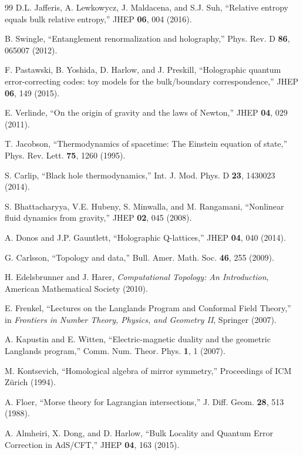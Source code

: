 \documentclass[12pt,a4paper]{article}
\begin{document}
\begin{thebibliography}{99}
D.L. Jafferis, A. Lewkowycz, J. Maldacena, and S.J. Suh, ``Relative entropy equals bulk relative entropy,'' JHEP \textbf{06}, 004 (2016).

B. Swingle, ``Entanglement renormalization and holography,'' Phys. Rev. D \textbf{86}, 065007 (2012).

F. Pastawski, B. Yoshida, D. Harlow, and J. Preskill, ``Holographic quantum error-correcting codes: toy models for the bulk/boundary correspondence,'' JHEP \textbf{06}, 149 (2015).

E. Verlinde, ``On the origin of gravity and the laws of Newton,'' JHEP \textbf{04}, 029 (2011).

T. Jacobson, ``Thermodynamics of spacetime: The Einstein equation of state,'' Phys. Rev. Lett. \textbf{75}, 1260 (1995).

S. Carlip, ``Black hole thermodynamics,'' Int. J. Mod. Phys. D \textbf{23}, 1430023 (2014).

S. Bhattacharyya, V.E. Hubeny, S. Minwalla, and M. Rangamani, ``Nonlinear fluid dynamics from gravity,'' JHEP \textbf{02}, 045 (2008).

A. Donos and J.P. Gauntlett, ``Holographic Q-lattices,'' JHEP \textbf{04}, 040 (2014).

G. Carlsson, ``Topology and data,'' Bull. Amer. Math. Soc. \textbf{46}, 255 (2009).

H. Edelsbrunner and J. Harer, \textit{Computational Topology: An Introduction}, American Mathematical Society (2010).

E. Frenkel, ``Lectures on the Langlands Program and Conformal Field Theory,'' in \textit{Frontiers in Number Theory, Physics, and Geometry II}, Springer (2007).

A. Kapustin and E. Witten, ``Electric-magnetic duality and the geometric Langlands program,'' Comm. Num. Theor. Phys. \textbf{1}, 1 (2007).

M. Kontsevich, ``Homological algebra of mirror symmetry,'' Proceedings of ICM Zürich (1994).

A. Floer, ``Morse theory for Lagrangian intersections,'' J. Diff. Geom. \textbf{28}, 513 (1988).

A. Almheiri, X. Dong, and D. Harlow, ``Bulk Locality and Quantum Error Correction in AdS/CFT,'' JHEP \textbf{04}, 163 (2015).


\end{thebibliography}
\end{document}
